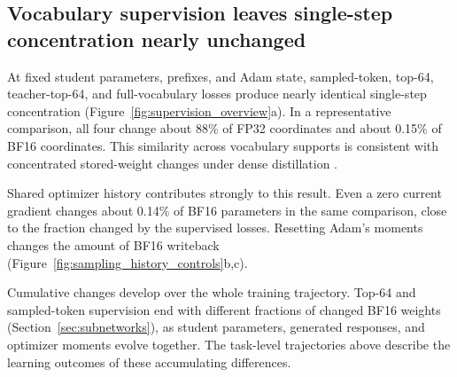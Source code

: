 



\subsection{Vocabulary supervision leaves single-step concentration nearly unchanged}

At fixed student parameters, prefixes, and Adam state, sampled-token, top-64, teacher-top-64, and full-vocabulary losses produce nearly identical single-step concentration (Figure~\ref{fig:supervision_overview}a). In a representative comparison, all four change about 88\% of FP32 coordinates and about 0.15\% of BF16 coordinates. This similarity across vocabulary supports is consistent with concentrated stored-weight changes under dense distillation \citep{yu2026denseupdates}.

Shared optimizer history contributes strongly to this result. Even a zero current gradient changes about 0.14\% of BF16 parameters in the same comparison, close to the fraction changed by the supervised losses. Resetting Adam's moments changes the amount of BF16 writeback (Figure~\ref{fig:sampling_history_controls}b,c).



Cumulative changes develop over the whole training trajectory. Top-64 and sampled-token supervision end with different fractions of changed BF16 weights (Section~\ref{sec:subnetworks}), as student parameters, generated responses, and optimizer moments evolve together. The task-level trajectories above describe the learning outcomes of these accumulating differences.

\FloatBarrier
